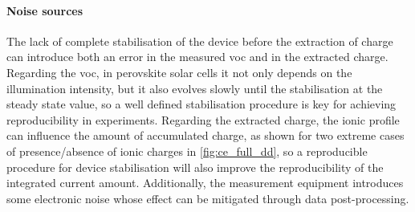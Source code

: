 	\paragraph{Noise sources} \label{ce_noise}
	The lack of complete stabilisation of the device before the extraction of charge can introduce both an error in the measured \gls{voc} and in the extracted charge.
	Regarding the \gls{voc}, in perovskite solar cells it not only depends on the illumination intensity, but it also evolves slowly until the stabilisation at the steady state value, so a well defined stabilisation procedure is key for achieving reproducibility in  experiments.
	Regarding the extracted charge, the ionic profile can influence the amount of accumulated charge, as shown for two extreme cases of presence/absence of ionic charges in \cref{fig:ce_full_dd}, so a reproducible procedure for device stabilisation will also improve the reproducibility of the integrated current amount.
	Additionally, the measurement equipment introduces some electronic noise whose effect can be mitigated through data post-processing.

